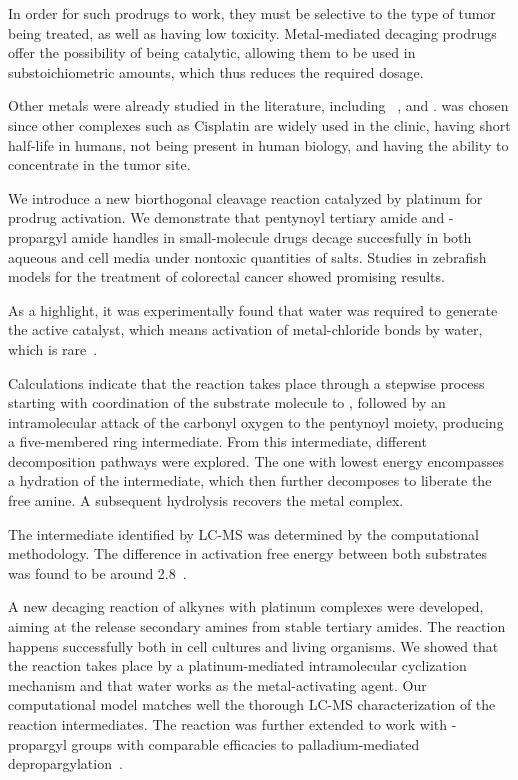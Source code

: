 In order for such prodrugs to work, they must be selective to the type of tumor
being treated, as well as having low toxicity.
Metal-mediated decaging prodrugs offer the possibility of being catalytic,
allowing them to be used in substoichiometric amounts, which thus reduces the
required dosage.

Other metals were already studied in the literature, including
~\cite{Coelho_2019},  and .
 was chosen since other complexes such as Cisplatin are widely used in
the clinic, having short half-life in humans, not being present in human
biology, and having the ability to concentrate in the tumor site.

We introduce a new biorthogonal cleavage reaction catalyzed by platinum for
prodrug activation.
We demonstrate that pentynoyl tertiary amide and -propargyl amide handles
in small-molecule drugs decage succesfully in both aqueous and cell media under
nontoxic quantities of  salts.
Studies in zebrafish models for the treatment of colorectal cancer showed
promising results.


As a highlight, it was experimentally found that water was required to generate
the active catalyst, which means activation of metal-chloride bonds by water,
which is rare~\cite{Vidal_2018}.


Calculations indicate that the reaction takes place through a stepwise process
starting with coordination of the substrate molecule to , followed by
an intramolecular attack of the carbonyl oxygen to the pentynoyl moiety,
producing a five-membered ring intermediate.
From this intermediate, different decomposition pathways were explored.
The one with lowest energy encompasses a hydration of the intermediate, which
then further decomposes to liberate the free amine.
A subsequent hydrolysis recovers the metal complex.


The intermediate  identified by LC-MS was determined by the computational
methodology.
The difference in activation free energy between both substrates was found to
be around 2.8~\kcalmol.

A new decaging reaction of alkynes with platinum complexes were developed,
aiming at the release secondary amines from stable tertiary amides.
The reaction happens successfully both in cell cultures and living organisms.
We showed that the reaction takes place by a platinum-mediated intramolecular
cyclization mechanism and that water works as the metal-activating agent.
Our computational model matches well the thorough LC-MS characterization of the
reaction intermediates.
The reaction was further extended to work with -propargyl groups with
comparable efficacies to palladium-mediated depropargylation~\cite{Coelho_2019}.


